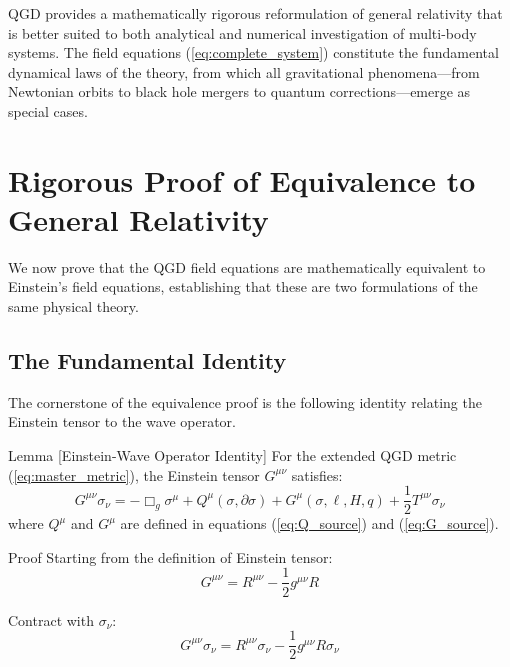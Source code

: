 \documentclass[11pt,a4paper]{article}
\theoremstyle{definition}
\theoremstyle{remark}
\begin{document}
		QGD provides a mathematically rigorous reformulation of general relativity that is better suited to both analytical and numerical investigation of multi-body systems. The field equations (\ref{eq:complete_system}) constitute the fundamental dynamical laws of the theory, from which all gravitational phenomena—from Newtonian orbits to black hole mergers to quantum corrections—emerge as special cases.
		
	
	\section{Rigorous Proof of Equivalence to General Relativity}
	
	We now prove that the QGD field equations are mathematically equivalent to Einstein's field equations, establishing that these are two formulations of the same physical theory.
	
	\subsection{The Fundamental Identity}
	
	The cornerstone of the equivalence proof is the following identity relating the Einstein tensor to the wave operator.
	
	Lemma [Einstein-Wave Operator Identity]\label{lem:key_identity}
		For the extended QGD metric (\ref{eq:master_metric}), the Einstein tensor $G^{\mu\nu}$ satisfies:
		\begin{equation}\label{eq:key_identity}
			\boxed{G^{\mu\nu}\sigma_\nu = -\Box_g\sigma^\mu + Q^\mu(\sigma,\partial\sigma) + G^\mu(\sigma,\ell,H,q) + \frac{1}{2}T^{\mu\nu}\sigma_\nu}
		\end{equation}
		where $Q^\mu$ and $G^\mu$ are defined in equations (\ref{eq:Q_source}) and (\ref{eq:G_source}).

	
	Proof
		Starting from the definition of Einstein tensor:
		\begin{equation}
			G^{\mu\nu} = R^{\mu\nu} - \frac{1}{2}g^{\mu\nu}R
		\end{equation}
		
		Contract with $\sigma_\nu$:
		\begin{equation}
			G^{\mu\nu}\sigma_\nu = R^{\mu\nu}\sigma_\nu - \frac{1}{2}g^{\mu\nu}R\sigma_\nu
		\end{equation}
		
\end{document}
